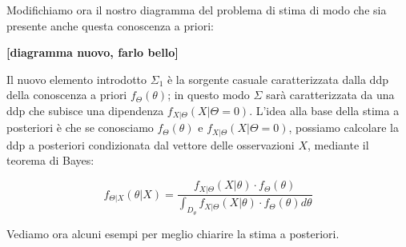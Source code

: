 Modifichiamo ora il nostro diagramma del problema di stima di modo che sia presente anche questa conoscenza a priori:

\begin{center}\textbf{[diagramma nuovo, farlo bello]}\end{center}

Il nuovo elemento introdotto $\Sigma_1$ è la sorgente casuale caratterizzata dalla ddp della conoscenza a priori $f_\Theta(\theta)$; in questo modo $\Sigma$ sarà caratterizzata da una ddp che subisce una dipendenza $f_{X|\Theta}(X|\Theta=0)$. L'idea alla base della stima a posteriori è che se conosciamo $f_{\Theta}(\theta)$ e $f_{X|\Theta}(X|\Theta=0)$, possiamo calcolare la ddp a posteriori  condizionata dal vettore delle osservazioni $X$, mediante il teorema di Bayes:

  \[ f_{\Theta|X}(\theta|X)=\frac{f_{X|\Theta}(X|\theta) \cdot f_\Theta(\theta)}{\int_{D_\theta}^{} f_{X|\Theta}(X|\theta) \cdot f_\Theta(\theta) d\theta } \]
  
Vediamo ora alcuni esempi per meglio chiarire la stima a posteriori.

